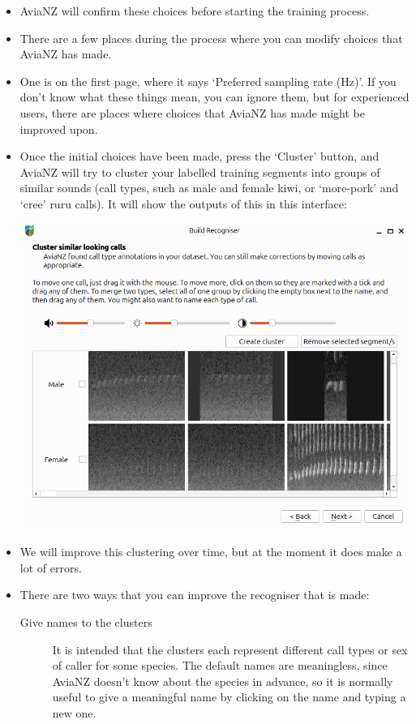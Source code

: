 \documentclass{article}
\begin{document}
\begin{itemize}
\item AviaNZ will confirm these choices before starting the training process. 
\item There are a few places during the process where you can modify choices that AviaNZ has made. 
\item One is on the first page, where it says `Preferred sampling rate (Hz)'. If you don't know what these things mean, you can ignore them, but for experienced users, there are places where choices that AviaNZ has made might be improved upon.
\item Once the initial choices have been made, press the `Cluster' button, and AviaNZ will try to cluster your labelled training segments into groups of similar sounds (call types, such as male and female kiwi, or `more-pork' and `cree' ruru calls). It will show the outputs of this in this interface:
\begin{center}
    \includegraphics[width=.95\textwidth]{Figures/BuildRecogniser2}
\end{center}
\item We will improve this clustering over time, but at the moment it does make a lot of errors. 
\item There are two ways that you can improve the recogniser that is made:

\begin{description}
\item[Give names to the clusters] It is intended that the clusters each represent different call types or sex of caller for some species. The default names are meaningless, since AviaNZ doesn't know about the species in advance, so it is normally useful to give a meaningful name by clicking on the name and typing a new one. 


\end{description}
\end{itemize}
\end{document}
